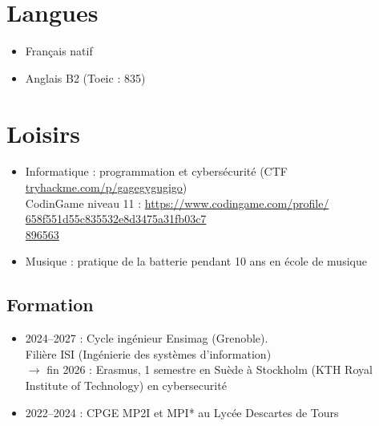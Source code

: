 \documentclass[10pt,oneside,a4paper,titlepage]{article}
\begin{document}
\begin{tcolorbox}
\begin{minipage}[t]{7cm}
\begin{tcolorbox}[grow to left by=0.6cm,colback=gray!25,colframe=white,height=22.5cm,valign=top]
      \section*{Langues}
      \begin{itemize}
        \renewcommand{\labelitemi}{-}
      \item Français natif
      \item Anglais B2 (Toeic : 835)
      \end{itemize}

      \section*{Loisirs}
      \begin{itemize}
        \raggedright
        \renewcommand{\labelitemi}{-}
      \item Informatique : programmation et cybersécurité (CTF \href{https://tryhackme.com/p/gagegygugigo}{tryhackme.com/p/gagegygugigo})\\ CodinGame niveau 11 : \href{https://www.codingame.com/profile/658f551d55c835532e8d3475a31fb03c7896563}{https://www.codingame.com/profile/\\658f551d55c835532e8d3475a31fb03c7\\896563}\\
      \item Musique : pratique de la batterie pendant 10 ans en école de musique
      \end{itemize}

    \end{tcolorbox}
  \end{minipage}
  \begin{minipage}[t]{11.6cm}
    \vspace*{-0.5cm}
    \begin{tcolorbox}[grow to right by=0.75cm,colframe=white,colback=white]
      \section*{Formation}
      \begin{itemize}
      \item{
          2024--2027 : Cycle ingénieur Ensimag (Grenoble).\\Filière ISI (Ingénierie des systèmes d'information)
          \vspace{3pt}\\
          $\rightarrow$ fin 2026 : Erasmus, 1 semestre en Suède à Stockholm (KTH Royal Institute of Technology) en cybersecurité
        }
      \item{2022--2024 : CPGE MP2I et MPI* au Lycée Descartes de Tours}
      \end{itemize}


\end{tcolorbox}
\end{minipage}
\end{tcolorbox}
\end{document}
